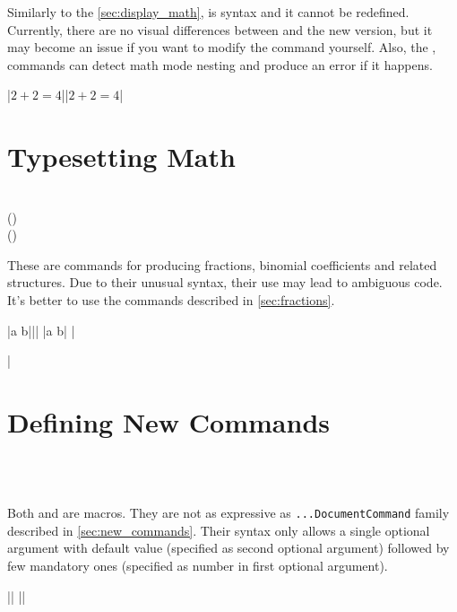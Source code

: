 Similarly to the \autoref{sec:display_math}, \ai{\$} is  syntax
and it cannot be redefined. Currently, there are no visual differences between
\ai{\$} and the new version, but it may become an
issue if you want to modify the command yourself. Also, the \csi{(}, \csi{)} commands
can detect math mode nesting and produce an error if it happens.

\chto|$ 2 + 2 = 4 $||\( 2 + 2 = 4 \)|

\section{Typesetting Math}
 {
   \\
   () \\
   ()
}

These are  commands for producing fractions, binomial
coefficients and related structures. Due to their unusual syntax, their use may
lead to ambiguous code. It's better to use the commands described in
\autoref{sec:fractions}.
\begin{chktexignore}
\chto|{a \over b}|||
\chto|{a \choose b}|
|\usepackage{amsmath}
|
\end{chktexignore}

\section{Defining New Commands}\label{sec:def}
 {
   \\
   \\
}

Both  and  are  macros. They
are not as expressive as \texttt{...DocumentCommand} family
described in \autoref{sec:new_commands}. Their syntax only allows a single
optional argument with default value (specified as second optional argument)
followed by few mandatory ones (specified as number in first optional
argument).
\begin{chktexignore}
  \vchto|\newcommand{\foo}[4][bar]{ ... }|
  ||
\end{chktexignore}

